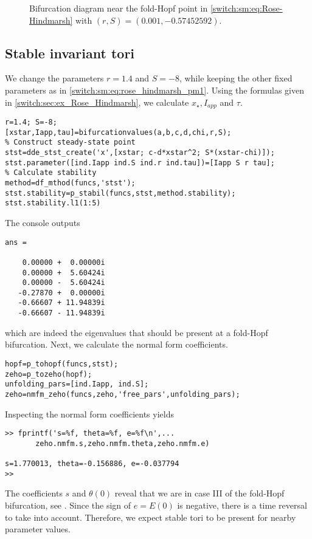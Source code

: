 \begin{figure}
\caption{Bifurcation diagram near the fold-Hopf point in \cref{switch:sm:eq:Rose-Hindmarsh} with $(r,S)=(0.001,-0.57452592)$.}
\label{switch:sm:fig:RH_bifurcation_diagram_I}
\end{figure}

\subsection{Stable invariant tori}
We change the parameters $r = 1.4$ and $S = -8$, while keeping the other fixed parameters as in \cref{switch:sm:eq:rose_hindmarsh_pm1}. Using the formulas given in \cref{switch:sec:ex_Rose_Hindmarsh}, we calculate $x_\star,I_{app}$ and $\tau$.
\begin{lstlisting}[style=customMatlab]
%% Different parameters with stable torus
r=1.4; S=-8;
[xstar,Iapp,tau]=bifurcationvalues(a,b,c,d,chi,r,S);
% Construct steady-state point
stst=dde_stst_create('x',[xstar; c-d*xstar^2; S*(xstar-chi)]);
stst.parameter([ind.Iapp ind.S ind.r ind.tau])=[Iapp S r tau];
% Calculate stability
method=df_mthod(funcs,'stst');
stst.stability=p_stabil(funcs,stst,method.stability);
stst.stability.l1(1:5)
\end{lstlisting}
The \MATLAB console outputs
\begin{lstlisting}[style=matlabConsole]
ans =

    0.00000 +  0.00000i
    0.00000 +  5.60424i
    0.00000 -  5.60424i
   -0.27870 +  0.00000i
   -0.66607 + 11.94839i
   -0.66607 - 11.94839i
\end{lstlisting}
which are indeed the eigenvalues that should be present at a fold-Hopf bifurcation. Next, we calculate the normal form coefficients.
\begin{lstlisting}[style=customMatlab]
% Calculate normal coefficients
hopf=p_tohopf(funcs,stst);
zeho=p_tozeho(hopf);
unfolding_pars=[ind.Iapp, ind.S];
zeho=nmfm_zeho(funcs,zeho,'free_pars',unfolding_pars);
\end{lstlisting}
Inspecting the normal form coefficients yields
\begin{lstlisting}[style=matlabConsole]
>> fprintf('s=%f, theta=%f, e=%f\n',...
       zeho.nmfm.s,zeho.nmfm.theta,zeho.nmfm.e)

s=1.770013, theta=-0.156886, e=-0.037794
>>
\end{lstlisting}
The coefficients $s$ and $\theta(0)$ reveal that we are in case III of the fold-Hopf bifurcation, see \cite[page 342]{Kuznetsov2004}. Since the sign of $e=E(0)$ is negative, there is a time reversal to take into account. Therefore, we expect stable tori to be present for nearby parameter values.

